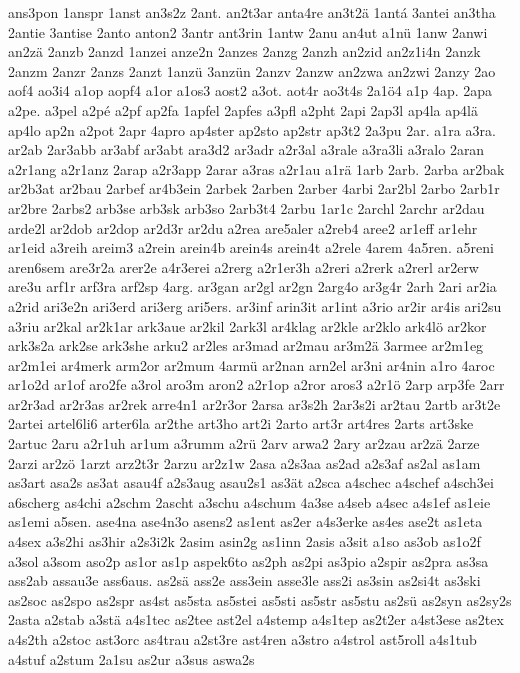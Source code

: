 {ans3pon
1anspr
1anst
an3s2z
2ant.
an2t3ar
anta4re
an3t2ä
1antá
3antei
an3tha
2antie
3antise
2anto
anton2
3antr
ant3rin
1antw
2anu
an4ut
a1nü
1anw
2anwi
an2zä
2anzb
2anzd
1anzei
anze2n
2anzes
2anzg
2anzh
an2zid
an2z1i4n
2anzk
2anzm
2anzr
2anzs
2anzt
1anzü
3anzün
2anzv
2anzw
an2zwa
an2zwi
2anzy
2ao
aof4
ao3i4
a1op
aopf4
a1or
a1os3
aost2
a3ot.
aot4r
ao3t4s
2a1ö4
a1p
4ap.
2apa
a2pe.
a3pel
a2pé
a2pf
ap2fa
1apfel
2apfes
a3pfl
a2pht
2api
2ap3l
ap4la
ap4lä
ap4lo
ap2n
a2pot
2apr
4apro
ap4ster
ap2sto
ap2str
ap3t2
2a3pu
2ar.
a1ra
a3ra.
ar2ab
2ar3abb
ar3abf
ar3abt
ara3d2
ar3adr
a2r3al
a3rale
a3ra3li
a3ralo
2aran
a2r1ang
a2r1anz
2arap
a2r3app
2arar
a3ras
a2r1au
a1rä
1arb
2arb.
2arba
ar2bak
ar2b3at
ar2bau
2arbef
ar4b3ein
2arbek
2arben
2arber
4arbi
2ar2bl
2arbo
2arb1r
ar2bre
2arbs2
arb3se
arb3sk
arb3so
2arb3t4
2arbu
1ar1c
2archl
2archr
ar2dau
arde2l
ar2dob
ar2dop
ar2d3r
ar2du
a2rea
are5aler
a2reb4
aree2
ar1eff
ar1ehr
ar1eid
a3reih
areim3
a2rein
arein4b
arein4s
arein4t
a2rele
4arem
4a5ren.
a5reni
aren6sem
are3r2a
arer2e
a4r3erei
a2rerg
a2r1er3h
a2reri
a2rerk
a2rerl
ar2erw
are3u
arf1r
arf3ra
arf2sp
4arg.
ar3gan
ar2gl
ar2gn
2arg4o
ar3g4r
2arh
2ari
ar2ia
a2rid
ari3e2n
ari3erd
ari3erg
ari5ers.
ar3inf
arin3it
ar1int
a3rio
ar2ir
ar4is
ari2su
a3riu
ar2kal
ar2k1ar
ark3aue
ar2kil
2ark3l
ar4klag
ar2kle
ar2klo
ark4lö
ar2kor
ark3s2a
ark2se
ark3she
arku2
ar2les
ar3mad
ar2mau
ar3m2ä
3armee
ar2m1eg
ar2m1ei
ar4merk
arm2or
ar2mum
4armü
ar2nan
arn2el
ar3ni
ar4nin
a1ro
4aroc
ar1o2d
ar1of
aro2fe
a3rol
aro3m
aron2
a2r1op
a2ror
aros3
a2r1ö
2arp
arp3fe
2arr
ar2r3ad
ar2r3as
ar2rek
arre4n1
ar2r3or
2arsa
ar3s2h
2ar3s2i
ar2tau
2artb
ar3t2e
2artei
artel6li6
arter6la
ar2the
art3ho
art2i
2arto
art3r
art4res
2arts
art3ske
2artuc
2aru
a2r1uh
ar1um
a3rumm
a2rü
2arv
arwa2
2ary
ar2zau
ar2zä
2arze
2arzi
ar2zö
1arzt
arz2t3r
2arzu
ar2z1w
2asa
a2s3aa
as2ad
a2s3af
as2al
as1am
as3art
asa2s
as3at
asau4f
a2s3aug
asau2s1
as3ät
a2sca
a4schec
a4schef
a4sch3ei
a6scherg
as4chi
a2schm
2ascht
a3schu
a4schum
4a3se
a4seb
a4sec
a4s1ef
as1eie
as1emi
a5sen.
ase4na
ase4n3o
asens2
as1ent
as2er
a4s3erke
as4es
ase2t
as1eta
a4sex
a3s2hi
as3hir
a2s3i2k
2asim
asin2g
as1inn
2asis
a3sit
a1so
as3ob
as1o2f
a3sol
a3som
aso2p
as1or
as1p
aspek6to
as2ph
as2pi
as3pio
a2spir
as2pra
as3sa
ass2ab
assau3e
ass6aus.
as2sä
ass2e
ass3ein
asse3le
ass2i
as3sin
as2si4t
as3ski
as2soc
as2spo
as2spr
as4st
as5sta
as5stei
as5sti
as5str
as5stu
as2sü
as2syn
as2sy2s
2asta
a2stab
a3stä
a4s1tec
as2tee
ast2el
a4stemp
a4s1tep
as2t2er
a4st3ese
as2tex
a4s2th
a2stoc
ast3orc
as4trau
a2st3re
ast4ren
a3stro
a4strol
ast5roll
a4s1tub
a4stuf
a2stum
2a1su
as2ur
a3sus
aswa2s
}
